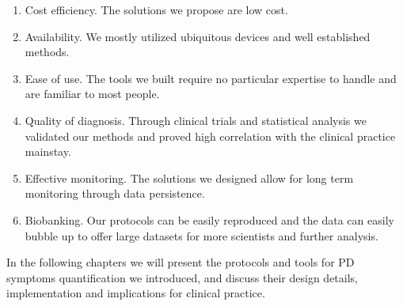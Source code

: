 \begin{enumerate}
\item Cost efficiency. The solutions we propose are low cost.
\item Availability. We mostly utilized ubiquitous devices and well established methods.
\item Ease of use. The tools we built require no particular expertise to handle and are familiar to most people.
\item Quality of diagnosis. Through clinical trials and statistical analysis we validated our methods and proved high correlation with the clinical practice mainstay.
\item Effective monitoring. The solutions we designed allow for long term monitoring through data persistence.
\item Biobanking. Our protocols can be easily reproduced and the data can easily bubble up to offer large datasets for more scientists and further analysis. 
\end{enumerate}

In the following chapters we will present the protocols and tools for \gls{PD} symptoms quantification we introduced, and discuss their design details, implementation and implications for clinical practice. 